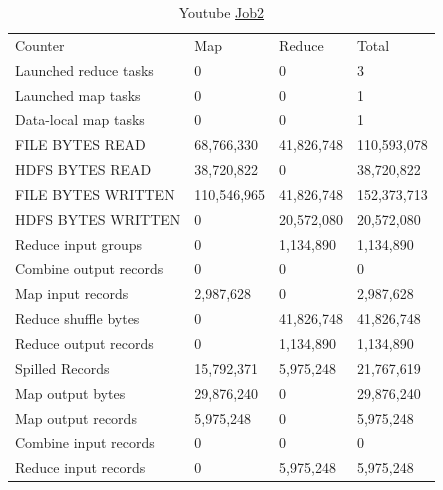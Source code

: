 \documentclass[paper=a4, fontsize=11pt]{scrartcl}	%
\numberwithin{equation}{section}															%
\numberwithin{figure}{section}																%
\numberwithin{table}{section}																%
\begin{document}
\begin{table}[!h]
	\centering
	\caption{Youtube \href{http://hadoop-compute0.di.univr.it:50030/jobdetails.jsp?jobid=job_201603141010_12292}{Job2}}
	\label{my-label}
	\begin{tabular}{llll}
Counter	&Map	&Reduce	&Total\\
Launched reduce tasks	&0	&0	&3\\
Launched map tasks	&0	&0	&1\\
Data-local map tasks	&0	&0	&1\\
FILE BYTES READ	&68,766,330	&41,826,748	&110,593,078\\
HDFS BYTES READ	&38,720,822	&0	&38,720,822\\
FILE BYTES WRITTEN &110,546,965	&41,826,748	&152,373,713\\
HDFS BYTES WRITTEN	&0	&20,572,080	&20,572,080\\
Reduce input groups	&0	&1,134,890	&1,134,890\\
Combine output records	&0	&0	&0\\
Map input records	&2,987,628	&0	&2,987,628\\
Reduce shuffle bytes	&0	&41,826,748	&41,826,748\\
Reduce output records	&0	&1,134,890	&1,134,890\\
Spilled Records	&15,792,371	&5,975,248	&21,767,619\\
Map output bytes	&29,876,240	&0	&29,876,240\\
Map output records	&5,975,248	&0	&5,975,248\\
Combine input records	&0	&0	&0\\
Reduce input records	&0	&5,975,248	&5,975,248\\
	\end{tabular}
\end{table}
\end{document}
